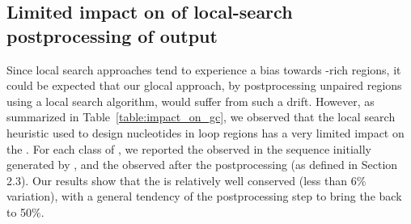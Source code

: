 

%

\subsection{Limited impact on \GC of local-search postprocessing of \ourprog output}
Since local search approaches tend to experience a bias towards \GC{}-rich regions, it could be expected that our glocal approach, by postprocessing unpaired regions using a local search algorithm, would suffer from such a drift.
However, as summarized in Table~\ref{table:impact_on_gc}, we observed that the local search heuristic used to design nucleotides in loop regions has a very limited impact on the \GCContent. For each class of \GCContent, we reported the observed \GCContent in the sequence initially generated by \ourprog, and the observed \GCContent after the \RNAinverse postprocessing (as defined in Section 2.3). Our results show that the \GCContent is relatively well conserved (less than 6\% variation), with a general tendency of the postprocessing step to bring the \GCContent back to 50\%. 

\begin{table}[ht!]
\begin{center}
\end{center}
\caption{Observed \GCContent of solutions returned by \ourprog (2nd column) and after the application of the local search postprocessing (3rd column).}
\label{table:impact_on_gc}
\end{table}
